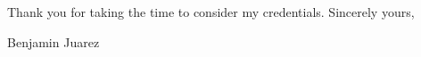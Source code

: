% 

Thank you for taking the time to consider my credentials.
\bigskip %
Sincerely yours,


Benjamin Juarez

% 
%  

